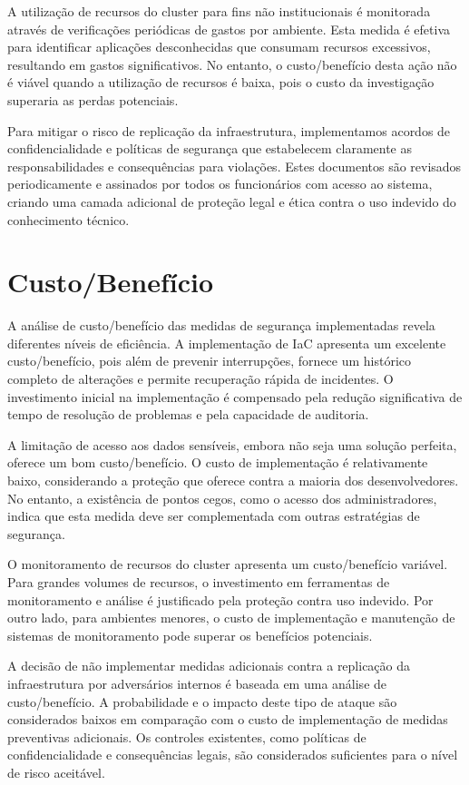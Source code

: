 \documentclass[12pt]{article}
\begin{document}
A utilização de recursos do cluster para fins não institucionais é monitorada através de verificações periódicas de gastos por ambiente. Esta medida é efetiva para identificar aplicações desconhecidas que consumam recursos excessivos, resultando em gastos significativos. No entanto, o custo/benefício desta ação não é viável quando a utilização de recursos é baixa, pois o custo da investigação superaria as perdas potenciais.

Para mitigar o risco de replicação da infraestrutura, implementamos acordos de confidencialidade e políticas de segurança que estabelecem claramente as responsabilidades e consequências para violações. Estes documentos são revisados periodicamente e assinados por todos os funcionários com acesso ao sistema, criando uma camada adicional de proteção legal e ética contra o uso indevido do conhecimento técnico.

\section{Custo/Benefício}

A análise de custo/benefício das medidas de segurança implementadas revela diferentes níveis de eficiência. A implementação de IaC apresenta um excelente custo/benefício, pois além de prevenir interrupções, fornece um histórico completo de alterações e permite recuperação rápida de incidentes. O investimento inicial na implementação é compensado pela redução significativa de tempo de resolução de problemas e pela capacidade de auditoria.

A limitação de acesso aos dados sensíveis, embora não seja uma solução perfeita, oferece um bom custo/benefício. O custo de implementação é relativamente baixo, considerando a proteção que oferece contra a maioria dos desenvolvedores. No entanto, a existência de pontos cegos, como o acesso dos administradores, indica que esta medida deve ser complementada com outras estratégias de segurança.

O monitoramento de recursos do cluster apresenta um custo/benefício variável. Para grandes volumes de recursos, o investimento em ferramentas de monitoramento e análise é justificado pela proteção contra uso indevido. Por outro lado, para ambientes menores, o custo de implementação e manutenção de sistemas de monitoramento pode superar os benefícios potenciais.

A decisão de não implementar medidas adicionais contra a replicação da infraestrutura por adversários internos é baseada em uma análise de custo/benefício. A probabilidade e o impacto deste tipo de ataque são considerados baixos em comparação com o custo de implementação de medidas preventivas adicionais. Os controles existentes, como políticas de confidencialidade e consequências legais, são considerados suficientes para o nível de risco aceitável.
\end{document}
